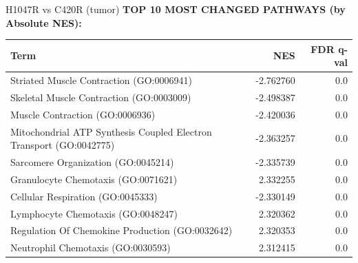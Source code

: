 \documentclass[10pt, aspectratio=169]{beamer}
\begin{document}
\begin{frame}{H1047R vs C420R (tumor)}
  \centering
  {\small \textbf{TOP 10 MOST CHANGED PATHWAYS (by Absolute NES):}}\par
  \vspace{0.15cm}
  \scriptsize
  \begin{tabular}{p{8.5cm} r r}
    \toprule
    \textbf{Term} & \textbf{NES} & \textbf{FDR q-val} \\
    \midrule
    Striated Muscle Contraction (GO:0006941) & -2.762760 & 0.0 \\
    Skeletal Muscle Contraction (GO:0003009) & -2.498387 & 0.0 \\
    Muscle Contraction (GO:0006936) & -2.420036 & 0.0 \\
    Mitochondrial ATP Synthesis Coupled Electron Transport (GO:0042775) & -2.363257 & 0.0 \\
    Sarcomere Organization (GO:0045214) & -2.335739 & 0.0 \\
    Granulocyte Chemotaxis (GO:0071621) & 2.332255 & 0.0 \\
    Cellular Respiration (GO:0045333) & -2.330149 & 0.0 \\
    Lymphocyte Chemotaxis (GO:0048247) & 2.320362 & 0.0 \\
    Regulation Of Chemokine Production (GO:0032642) & 2.320353 & 0.0 \\
    Neutrophil Chemotaxis (GO:0030593) & 2.312415 & 0.0 \\
    \bottomrule
  \end{tabular}
\end{frame}
\end{document}
